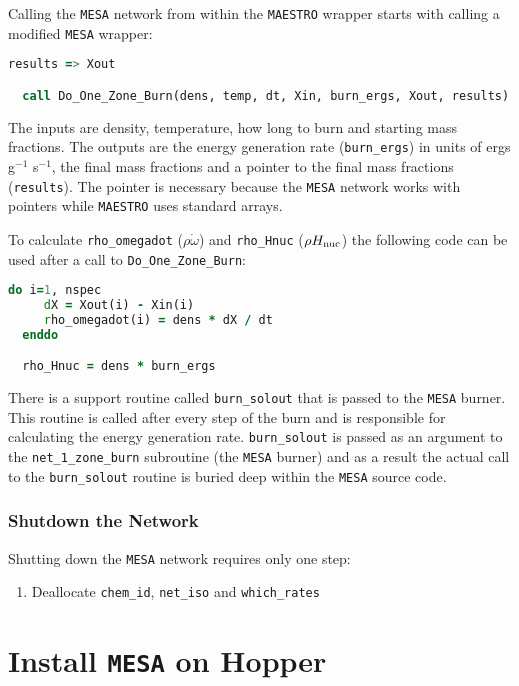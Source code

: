 Calling the {\tt MESA} network from within the {\tt MAESTRO} wrapper starts 
with calling a modified {\tt MESA} wrapper:
\begin{lstlisting}[language=fortran,mathescape=false]
  results => Xout

  call Do_One_Zone_Burn(dens, temp, dt, Xin, burn_ergs, Xout, results)
\end{lstlisting}
The inputs are density, temperature, how long to burn and starting mass 
fractions. The outputs are the energy generation rate ({\tt burn\_ergs}) 
in units of ergs g$^{-1}$ s$^{-1}$, the final mass fractions and a pointer 
to the final mass fractions ({\tt results}). The pointer is necessary 
because the {\tt MESA} network works with pointers while {\tt MAESTRO} 
uses standard arrays.

To calculate {\tt rho\_omegadot} ($\rho \dot{\omega}$) and {\tt rho\_Hnuc} 
($\rho H_{{\rm nuc}}$) the following code can be used after a call to 
{\tt Do\_One\_Zone\_Burn}:
\begin{lstlisting}[language=fortran,mathescape=false]
  do i=1, nspec
     dX = Xout(i) - Xin(i)
     rho_omegadot(i) = dens * dX / dt
  enddo

  rho_Hnuc = dens * burn_ergs
\end{lstlisting}
There is a support routine called {\tt burn\_solout} that is passed to the 
{\tt MESA} burner. This routine is called after every step of the burn and 
is responsible for calculating the energy generation rate. {\tt burn\_solout} 
is passed as an argument to the {\tt net\_1\_zone\_burn} subroutine (the 
{\tt MESA} burner) and as a result the actual call to the {\tt burn\_solout} 
routine is buried deep within the {\tt MESA} source code.

\subsubsection{Shutdown the Network}

Shutting down the {\tt MESA} network requires only one step:
\begin{enumerate}
\item Deallocate {\tt chem\_id}, {\tt net\_iso} and {\tt which\_rates}
\end{enumerate}


\section{Install {\tt MESA} on Hopper}
\label{sec:hopper_install}







